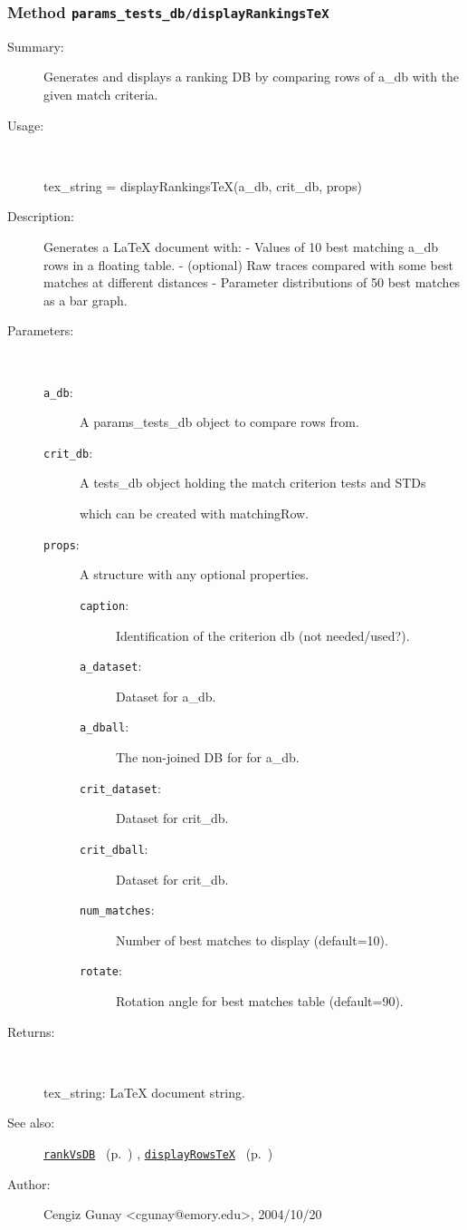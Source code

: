 \subsubsection[Method \texttt{displayRankingsTeX}]{Method \texttt{params\_tests\_db/displayRankingsTeX}}%
%
\label{ref_params_tests_db__displayRankingsTeX}%
\hypertarget{ref_params_tests_db__displayRankingsTeX}{}%
\begin{description}
\item[Summary:]Generates and displays a ranking DB by comparing rows of a\_db with the given match criteria.
%
\item[Usage:]~%
\begin{lyxcode}%
tex\_string = displayRankingsTeX(a\_db, crit\_db, props)
%
\end{lyxcode}%
%
\item[Description:]%
Generates a LaTeX document with:
	- Values of 10 best matching a\_db rows in a floating table.
	- (optional) Raw traces compared with some best matches at different distances
	- Parameter distributions of 50 best matches as a bar graph.
\item[Parameters:]~
\begin{description}%
\item[\texttt{a\_db}:]
 A params\_tests\_db object to compare rows from.
\item[\texttt{crit\_db}:]
 A tests\_db object holding the match criterion tests and STDs

which can be created with matchingRow.\item[\texttt{props}:]
 A structure with any optional properties.
\begin{description}%
\item[\texttt{caption}:]
 Identification of the criterion db (not needed/used?).
\item[\texttt{a\_dataset}:]
 Dataset for a\_db.
\item[\texttt{a\_dball}:]
 The non-joined DB for for a\_db.
\item[\texttt{crit\_dataset}:]
 Dataset for crit\_db.
\item[\texttt{crit\_dball}:]
 Dataset for crit\_db.
\item[\texttt{num\_matches}:]
 Number of best matches to display (default=10).
\item[\texttt{rotate}:]
 Rotation angle for best matches table (default=90).
\end{description}%
\end{description}%
%
\item[Returns:]~

	tex\_string: LaTeX document string.
%
%
\item[See also:]%
\hyperlink{ref_rankVsDB}{\texttt{rankVsDB}}%
\ (p.~\pageref{ref_rankVsDB})%
%
, \hyperlink{ref_displayRowsTeX}{\texttt{displayRowsTeX}}%
\ (p.~\pageref{ref_displayRowsTeX})%
%
%
\item[Author:]%
Cengiz Gunay <cgunay@emory.edu>, 2004/10/20%
\end{description}
\methodline%
